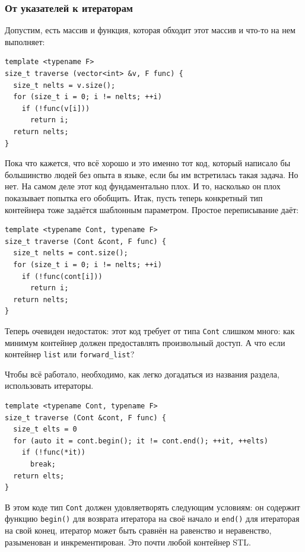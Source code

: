 \documentclass[a4paper,12pt,oneside]{article}
\begin{document}
\subsubsection{От указателей к итераторам}\label{PointersToIterators}

Допустим, есть массив и функция, которая обходит этот массив и что-то на нем выполняет:

\begin{lstlisting}
template <typename F>
size_t traverse (vector<int> &v, F func) {
  size_t nelts = v.size();
  for (size_t i = 0; i != nelts; ++i)
    if (!func(v[i]))
      return i;
  return nelts;
}
\end{lstlisting}

Пока что кажется, что всё хорошо и это именно тот код, который написало бы большинство людей без опыта в языке, если бы им встретилась такая задача. Но нет. На самом деле этот код фундаментально плох. И то, насколько он плох показывает попытка его обобщить. Итак, пусть теперь конкретный тип контейнера тоже задаётся шаблонным параметром. Простое переписывание даёт:

\begin{lstlisting}
template <typename Cont, typename F>
size_t traverse (Cont &cont, F func) {
  size_t nelts = cont.size();
  for (size_t i = 0; i != nelts; ++i)
    if (!func(cont[i]))
      return i;
  return nelts;
}
\end{lstlisting}

Теперь очевиден недостаток: этот код требует от типа \lstinline!Cont! слишком много: как минимум контейнер должен предоставлять произвольный доступ. А что если контейнер \lstinline!list! или \lstinline!forward_list!?

Чтобы всё работало, необходимо, как легко догадаться из названия раздела, использовать итераторы.

\begin{lstlisting}
template <typename Cont, typename F>
size_t traverse (Cont &cont, F func) {
  size_t elts = 0
  for (auto it = cont.begin(); it != cont.end(); ++it, ++elts)
    if (!func(*it))
      break;
  return elts;
}
\end{lstlisting}

В этом коде тип \lstinline!Cont! должен удовляетворять следующим условиям: он содержит функцию \lstinline!begin()! для возврата итератора на своё начало и \lstinline!end()! для итераторая на свой конец, итератор может быть сравнён на равенство и неравенство, разыменован и инкрементирован. Это почти любой контейнер STL.
\end{document}
